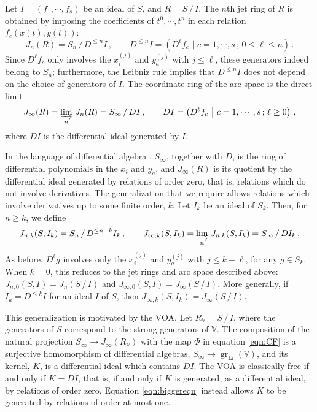 \documentclass[12pt]{article}
\numberwithin{equation}{section}
\numberwithin{figure}{section}
\theoremstyle{plain}
\theoremstyle{definition}
\begin{document}
Let $I = (f_1, \cdots, f_s)$ be an ideal of $S$, and $R = S \, / \, I$. The $n$th jet ring of $R$ is obtained by imposing the coefficients of $t^0, \cdots, t^n$ in each relation $f_c(x(t), y(t))$:
\begin{equation}
    J_n(R) = S_n \, / \, D^{\leq n}I \,, \qquad D^{\leq n}I = \left( D^\ell f_c \,\, \big| \,\, c = 1, \cdots, s \,;\, 0 \leq \ell \leq n \right) \,.
\end{equation}
Since $D^\ell f_c$ only involves the $x_i^{(j)}$ and $y_a^{(j)}$ with $j \leq \ell$, these generators indeed belong to $S_n$; furthermore, the Leibniz rule implies that $D^{\leq n}I$ does not depend on the choice of generators of $I$. The coordinate ring of the arc space is the direct limit
\begin{equation}
    J_\infty(R) = \varinjlim_n \, J_n(R) = S_\infty \, / \, DI \,, \qquad DI = \left( D^\ell f_c \,\, \big| \,\, c = 1, \cdots, s \,;\, \ell \geq 0 \right) \,,
\end{equation}
where $DI$ is the differential ideal generated by $I$.

In the language of differential algebra \cite{Ritt,Kolchin}, $S_\infty$, together with $D$, is the ring of differential polynomials in the $x_i$ and $y_a$, and $J_\infty(R)$ is its quotient by the differential ideal generated by relations of order zero, that is, relations which do not involve derivatives. The generalization that we require allows relations which involve derivatives up to some finite order, $k$. Let $I_k$ be an ideal of $S_k$. Then, for $n \geq k$, we define
\begin{equation}\label{eqn:knJet}
    J_{n,k}(S, I_k) = S_n \, / \, D^{\leq n-k}I_k \,, \qquad J_{\infty,k}(S, I_k) = \varinjlim_n \, J_{n,k}(S, I_k) = S_\infty \, / \, DI_k \,.
\end{equation}
As before, $D^\ell g$ involves only the $x_i^{(j)}$ and $y_a^{(j)}$ with $j \leq k + \ell$, for any $g \in S_k$. When $k = 0$, this reduces to the jet rings and arc space described above: $J_{n,0}(S, I) = J_n(S \, / \, I)$ and $J_{\infty,0}(S, I) = J_\infty(S \, / \, I)$. More generally, if $I_k = D^{\leq k}I$ for an ideal $I$ of $S$, then $J_{\infty,k}(S, I_k) = J_\infty(S \, / \, I)$.

This generalization is motivated by the VOA. Let $R_\mathbb{V} = S \, / \, I$, where the generators of $S$ correspond to the strong generators of $\mathbb{V}$. The composition of the natural projection $S_\infty \rightarrow J_\infty(R_\mathbb{V})$ with the map $\Phi$ in equation \eqref{eqn:CF} is a surjective homomorphism of differential algebras, $S_\infty \rightarrow \operatorname{gr}_{\operatorname{Li}}(\mathbb{V})$, and its kernel, $K$, is a differential ideal which contains $DI$. The VOA is classically free if and only if $K = DI$, that is, if and only if $K$ is generated, as a differential ideal, by relations of order zero. Equation \eqref{eqn:biggereqn} instead allows $K$ to be generated by relations of order at most one.
\end{document}
